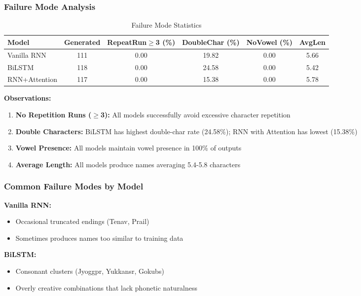 \documentclass[12pt,a4paper]{article}
\begin{document}
\subsubsection{Failure Mode Analysis}

\begin{table}[H]
\centering
\caption{Failure Mode Statistics}
\begin{tabular}{@{}lccccc@{}}
\toprule
\textbf{Model} & \textbf{Generated} & \textbf{RepeatRun$\geq$3 (\%)} & \textbf{DoubleChar (\%)} & \textbf{NoVowel (\%)} & \textbf{AvgLen} \\
\midrule
Vanilla RNN & 111 & 0.00 & 19.82 & 0.00 & 5.66 \\
BiLSTM & 118 & 0.00 & 24.58 & 0.00 & 5.42 \\
RNN+Attention & 117 & 0.00 & 15.38 & 0.00 & 5.78 \\
\bottomrule
\end{tabular}
\end{table}

\textbf{Observations:}
\begin{enumerate}
    \item \textbf{No Repetition Runs ($\geq$3):} All models successfully avoid excessive character repetition
    \item \textbf{Double Characters:} BiLSTM has highest double-char rate (24.58\%); RNN with Attention has lowest (15.38\%)
    \item \textbf{Vowel Presence:} All models maintain vowel presence in 100\% of outputs
    \item \textbf{Average Length:} All models produce names averaging 5.4-5.8 characters
\end{enumerate}

\subsubsection{Common Failure Modes by Model}

\textbf{Vanilla RNN:}
\begin{itemize}
    \item Occasional truncated endings (Tenav, Prail)
    \item Sometimes produces names too similar to training data
\end{itemize}

\textbf{BiLSTM:}
\begin{itemize}
    \item Consonant clusters (Jyoggpr, Yukkansr, Gokubs)
    \item Overly creative combinations that lack phonetic naturalness
\end{itemize}
\end{document}

